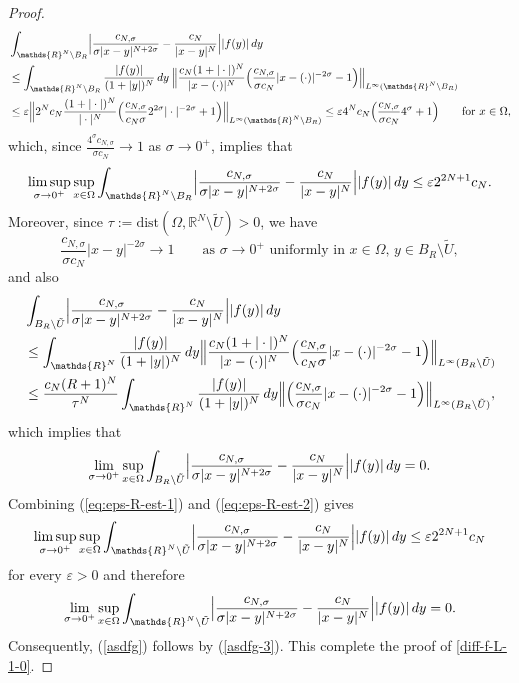 \documentclass[notitlepage,11pt,reqno]{amsart}
\theoremstyle{definition}
\numberwithin{equation}{section}
\newcommand{\eps}{{\varepsilon}}
\newcommand{\R}{\mathds{R}}
\newcommand{\RR}{\mathds{R}}
\begin{document}
\begin{proof}
\begin{align*}
  & \int_{\RR^N\setminus B_R}\Bigl|\frac{c_{N, \sigma}}{\sigma |x-y|^{N+2\sigma}}- \frac{c_N}{|x-y|^{N}}\Bigr||f(y)| \,dy\\
  &\le \int_{\R^N \setminus B_R} \frac{|f(y)|}{(1+|y|)^N} \,dy\: \Bigl\| \frac{c_N (1+|\cdot|)^{N}}{|x-(\cdot)|^{N}} \Bigl(\frac{c_{N, \sigma}}{\sigma c_N } |x-(\cdot)|^{-2\sigma}- 1\Bigr)\Bigr\|_{L^\infty(\R^N \setminus B_R)}\\
  &\le \eps \Bigl\| 2^N c_N \frac{(1+|\cdot|)^{N}}{|\cdot|^{N}} \Bigl(\frac{c_{N, \sigma}}{c_N \sigma} 2^{2\sigma}|\cdot |^{-2\sigma} + 1\Bigr)\Bigr\|_{L^\infty(\R^N \setminus B_R)} \le \eps  4^{N} c_N  \Bigl(\frac{c_{N, \sigma}}{\sigma c_N }4^{\sigma} + 1\Bigr) \qquad \text{for $x \in \Omega$,}
\end{align*}
which, since $\frac{4^{\sigma}c_{N, \sigma}}{\sigma c_N }\to 1$ as $\sigma \to 0^+$, implies that
\begin{equation}
  \label{eq:eps-R-est-1}
\limsup_{\sigma \to 0^+}\sup_{x \in \Omega} \int_{\RR^N\setminus B_R}\Bigl|\frac{c_{N, \sigma}}{\sigma |x-y|^{N+2\sigma}}- \frac{c_N}{|x-y|^{N}}\Bigr||f(y)| \,dy \le \eps  2^{2N+1} c_N.
\end{equation}
Moreover, since $\tau:=\text{dist} (\Omega, \R^N \setminus \tilde U)>0$, we have
$$
\frac{c_{N, \sigma}}{\sigma c_N } |x-y|^{-2\sigma} \to 1 \qquad \text{as $\sigma \to 0^+$ uniformly in $x \in \Omega$, $y \in B_R \setminus \tilde U,$}
$$
and also 
\begin{align*}
&\int_{B_R \setminus \tilde U}\Bigl|\frac{c_{N, \sigma}}{\sigma |x-y|^{N+2\sigma}}- \frac{c_N}{|x-y|^{N}}\Bigr||f(y)| \,dy\\  
  &\le \int_{\R^N} \frac{|f(y)|}{(1+|y|)^N} \,dy  \Bigl\| \frac{c_N (1+|\cdot|)^{N}}{|x-(\cdot)|^{N}} \Bigl(\frac{c_{N, \sigma}}{c_N \sigma} |x-(\cdot)|^{-2\sigma}- 1\Bigr)\Bigr\|_{L^\infty(B_R \setminus \tilde U)}\\   
  &\le \frac{c_N (R+1)^{N}}{\tau^{N}}  \int_{\R^N} \frac{|f(y)|}{(1+|y|)^N} \,dy
    \Bigl\|  \Bigl(\frac{c_{N, \sigma}}{\sigma c_N } |x-(\cdot)|^{-2\sigma}- 1\Bigr)\Bigr\|_{L^\infty(B_R \setminus \tilde U)},  
\end{align*}
which implies that 
\begin{equation}
  \label{eq:eps-R-est-2}
\lim_{\sigma \to 0^+}\sup_{x \in \Omega} \int_{B_R \setminus \tilde U}\Bigl|\frac{c_{N, \sigma}}{\sigma |x-y|^{N+2\sigma}}- \frac{c_N}{|x-y|^{N}}\Bigr||f(y)| \,dy =0. 
\end{equation}
Combining (\ref{eq:eps-R-est-1}) and (\ref{eq:eps-R-est-2}) gives 
$$
\limsup_{\sigma \to 0^+}\sup_{x \in \Omega} \int_{\RR^N\setminus \tilde U}\Bigl|\frac{c_{N, \sigma}}{\sigma |x-y|^{N+2\sigma}}- \frac{c_N}{|x-y|^{N}}\Bigr||f(y)| \,dy \le \eps  2^{2N+1} c_N
$$
for every $\eps>0$ and therefore 
\begin{equation*}
  \label{eq:eps-R-est-3}
\lim_{\sigma \to 0^+}\sup_{x \in \Omega} \int_{\RR^N\setminus \tilde U}\Bigl|\frac{c_{N, \sigma}}{\sigma |x-y|^{N+2\sigma}}- \frac{c_N}{|x-y|^{N}}\Bigr||f(y)| \,dy = 0.
\end{equation*}
Consequently, (\ref{asdfg}) follows by (\ref{asdfg-3}). This complete the proof of \eqref{diff-f-L-1-0}.
\end{proof}
\end{document}
